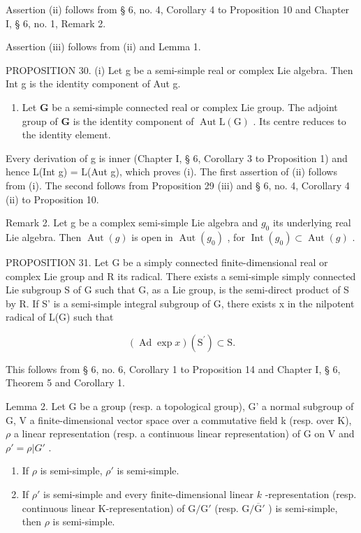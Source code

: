 Assertion (ii) follows from § 6, no. 4, Corollary 4 to Proposition 10 and Chapter I, § 6, no. 1, Remark 2.

Assertion (iii) follows from (ii) and Lemma 1.

PROPOSITION 30. (i) Let g be a semi-simple real or complex Lie algebra. Then Int g is the identity component of Aut g.

\begin{enumerate}
\def\labelenumi{(\roman{enumi})}
\setcounter{enumi}{1}
\tightlist
\item
  Let \(\mathbf{G}\) be a semi-simple connected real or complex Lie group. The adjoint group of \(\mathbf{G}\) is the identity component of \(\operatorname{Aut} \mathrm{L}(\mathrm{G})\) . Its centre reduces to the identity element.
\end{enumerate}

Every derivation of g is inner (Chapter I, § 6, Corollary 3 to Proposition 1) and hence L(Int g) = L(Aut g), which proves (i). The first assertion of (ii) follows from (i). The second follows from Proposition 29 (iii) and § 6, no. 4, Corollary 4 (ii) to Proposition 10.

Remark 2. Let g be a complex semi-simple Lie algebra and \(g_{0}\) its underlying real Lie algebra. Then \(\operatorname{Aut}(g)\) is open in \(\operatorname{Aut}(g_{0})\) , for \(\operatorname{Int}(g_{0}) \subset \operatorname{Aut}(g)\) .

PROPOSITION 31. Let G be a simply connected finite-dimensional real or complex Lie group and R its radical. There exists a semi-simple simply connected Lie subgroup S of G such that G, as a Lie group, is the semi-direct product of S by R. If S' is a semi-simple integral subgroup of G, there exists x in the nilpotent radical of L(G) such that

\[
(\operatorname{Ad} \exp x) (\mathrm{S} ^ {\prime}) \subset \mathrm{S}.
\]

This follows from § 6, no. 6, Corollary 1 to Proposition 14 and Chapter I, § 6, Theorem 5 and Corollary 1.

Lemma 2. Let G be a group (resp. a topological group), G' a normal subgroup of G, V a finite-dimensional vector space over a commutative field k (resp. over K), \(\rho\) a linear representation (resp. a continuous linear representation) of G on V and \(\rho' = \rho|G'\) .

\begin{enumerate}
\def\labelenumi{(\roman{enumi})}
\item
  If \(\rho\) is semi-simple, \(\rho'\) is semi-simple.
\item
  If \(\rho'\) is semi-simple and every finite-dimensional linear \(k\) -representation (resp. continuous linear K-representation) of \(\mathrm{G} / \mathrm{G}'\) (resp. \(\mathrm{G} / \overline{\mathrm{G}}'\) ) is semi-simple, then \(\rho\) is semi-simple.
\end{enumerate}

